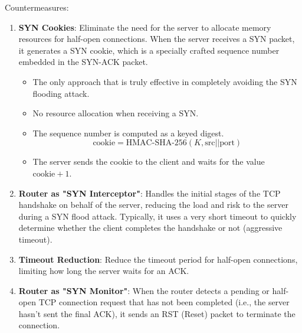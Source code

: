 Countermeasures:
\begin{enumerate}
    \item \textbf{SYN Cookies}: Eliminate the need for the server to allocate memory resources for half-open connections. When the server receives a SYN packet, it generates a SYN cookie, which is a specially crafted sequence number embedded in the SYN-ACK packet.
    \begin{itemize}
        \item The only approach that is truly effective in completely avoiding the SYN flooding attack.
        \item No resource allocation when receiving a SYN.
        \item The sequence number is computed as a keyed digest.
        \[
            \text{cookie} = \text{HMAC-SHA-256}(K, \text{src} || \text{port})
        \]
        \item The server sends the cookie to the client and waits for the value \(\text{cookie}+1\).
    \end{itemize}
    \item \textbf{Router as "SYN Interceptor"}: Handles the initial stages of the TCP handshake on behalf of the server, reducing the load and risk to the server during a SYN flood attack. Typically, it uses a very short timeout to quickly determine whether the client completes the handshake or not (aggressive timeout).
    \item \textbf{Timeout Reduction}: Reduce the timeout period for half-open connections, limiting how long the server waits for an ACK.
    \item \textbf{Router as "SYN Monitor"}: When the router detects a pending or half-open TCP connection request that has not been completed (i.e., the server hasn’t sent the final ACK), it sends an RST (Reset) packet to terminate the connection.
\end{enumerate}

